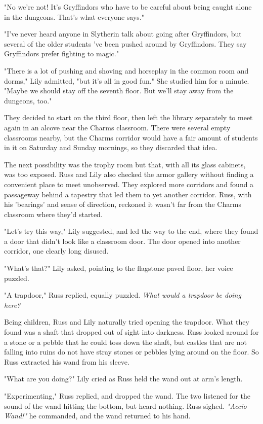 \documentclass[a4paper,11pt]{article}
\begin{document}
"No we're not! It's Gryffindors who have to be careful about being caught alone in the dungeons. That's what everyone says."

"I've never heard anyone in Slytherin talk about going after Gryffindors, but several of the older students 've been pushed around by Gryffindors. They say Gryffindors prefer fighting to magic."

"There is a lot of pushing and shoving and horseplay in the common room and dorms," Lily admitted, "but it's all in good fun." She studied him for a minute. "Maybe we should stay off the seventh floor. But we'll stay away from the dungeons, too."

They decided to start on the third floor, then left the library separately to meet again in an alcove near the Charms classroom. There were several empty classrooms nearby, but the Charms corridor would have a fair amount of students in it on Saturday and Sunday mornings, so they discarded that idea.

The next possibility was the trophy room but that, with all its glass cabinets, was too exposed. Russ and Lily also checked the armor gallery without finding a convenient place to meet unobserved. They explored more corridors and found a passageway behind a tapestry that led them to yet another corridor. Russ, with his 'bearings' and sense of direction, reckoned it wasn't far from the Charms classroom where they'd started.

"Let's try this way," Lily suggested, and led the way to the end, where they found a door that didn't look like a classroom door. The door opened into another corridor, one clearly long disused.

"What's that?" Lily asked, pointing to the flagstone paved floor, her voice puzzled.

"A trapdoor," Russ replied, equally puzzled. \emph{What would a trapdoor be doing here?}

Being children, Russ and Lily naturally tried opening the trapdoor. What they found was a shaft that dropped out of sight into darkness. Russ looked around for a stone or a pebble that he could toss down the shaft, but castles that are not falling into ruins do not have stray stones or pebbles lying around on the floor. So Russ extracted his wand from his sleeve.

"What are you doing?" Lily cried as Russ held the wand out at arm's length.

"Experimenting," Russ replied, and dropped the wand. The two listened for the sound of the wand hitting the bottom, but heard nothing. Russ sighed. \emph{"Accio Wand!"} he commanded, and the wand returned to his hand.
\end{document}
